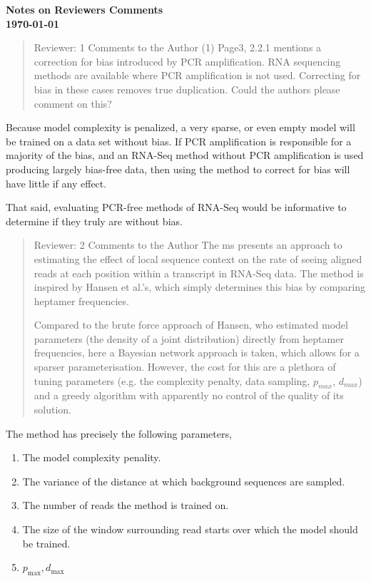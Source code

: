 \documentclass{article}
\begin{document}
\textbf{Notes on Reviewers Comments} \\
\textbf{\today}


\begin{quote}
Reviewer: 1
Comments to the Author
(1) Page3, 2.2.1 mentions a correction for bias introduced by PCR amplification.  RNA sequencing methods are available where PCR amplification is not used.  Correcting for bias in these cases removes true duplication.  Could the authors please comment on this?
\end{quote}

Because model complexity is penalized, a very sparse, or even empty model will
be trained on a data set without bias.  If PCR amplification is responsible for
a majority of the bias, and an RNA-Seq method without PCR amplification is used
producing largely bias-free data, then using the method to correct for bias
will have little if any effect.

That said, evaluating PCR-free methods of RNA-Seq would be informative to
determine if they truly are without bias.


\begin{quote}
Reviewer: 2
Comments to the Author
The ms presents an approach to estimating the effect of local sequence
context on the rate of seeing aligned reads at each position within a
transcript in RNA-Seq data. The method is inspired by Hansen et al.'s,
which simply determines this bias by comparing heptamer frequencies.

Compared to the brute force approach of Hansen, who estimated model
parameters (the density of a joint distribution) directly from
heptamer frequencies, here a Bayesian network approach is taken, which
allows for a sparser parameterisation. However, the cost for this are
a plethora of tuning parameters (e.g. the complexity penalty, data
sampling, $p_{max}$, $d_{max}$) and a greedy algorithm with apparently no
control of the quality of its solution.
\end{quote}

The method has precisely the following parameters,
\begin{enumerate}
\item The model complexity penality.
\item The variance of the distance at which background sequences are sampled.
\item The number of reads the method is trained on.
\item The size of the window surrounding read starts over which the model should
be trained.
\item $p_{\text{max}}, d_{\text{max}}$
\end{enumerate}
\end{document}
